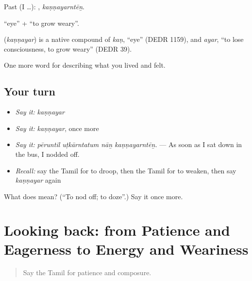 Past (I …): , \emph{kaṇṇayarntēṉ}.

 \textquotedblleft{}eye\textquotedblright{} +  \textquotedblleft{}to grow weary\textquotedblright{}.

\begin{cousinweb}
\textbf{} (\emph{kaṇṇayar}) is a native compound of  \emph{kaṇ}, \textquotedblleft{}eye\textquotedblright{} (DEDR 1159), and  \emph{ayar}, \textquotedblleft{}to lose consciousness, to grow weary\textquotedblright{} (DEDR 39).
\end{cousinweb}

\begin{grammarlens}[title={What you've built}]
One more word for describing what you lived and felt.
\end{grammarlens}

\subsection*{Your turn}
\begin{itemize}
\raggedright
  \item \emph{Say it:} \emph{kaṇṇayar}
  \item \emph{Say it:} \emph{kaṇṇayar}, once more
  \item \emph{Say it:} \emph{pēruntil uṭkārntatum nāṉ kaṇṇayarntēṉ.} — As soon as I sat down in the bus, I nodded off.
  \item \emph{Recall:} say the Tamil for to droop, then the Tamil for to weaken, then say \emph{kaṇṇayar} again
\end{itemize}

\begin{tcolorbox}[breakable,colback=teal!4,colframe=teal!35!black,title={Before you move on}]
What does  mean? (\textquotedblleft{}To nod off; to doze\textquotedblright{}.) Say it once more.
\end{tcolorbox}
\section[(dialogue)]{Looking back: from Patience and Eagerness to Energy and Weariness}

\label{lesson:TA-R468-review-461-468}



\begin{quote}
Say the Tamil for patience and composure.
\end{quote}

